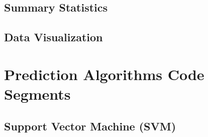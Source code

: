 \documentclass{article}
\begin{document}
\subsection{Summary Statistics}

\subsection{Data Visualization}

\section{Prediction Algorithms Code Segments}

\subsection{Support Vector Machine (SVM)} \label{app:SVMCode}
\end{document}

